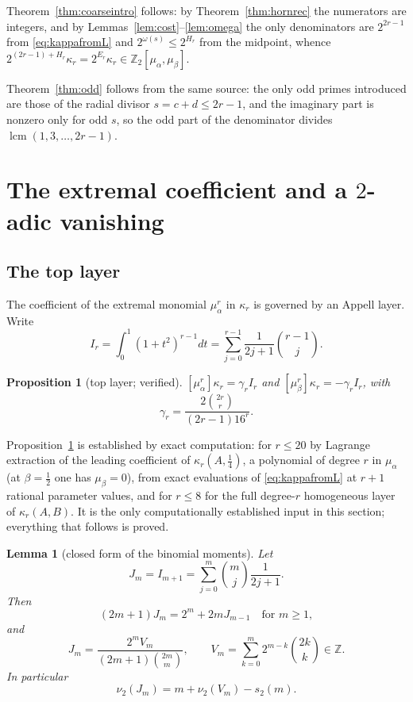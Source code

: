 \documentclass[10pt,a4paper]{amsart}
\newtheorem{lemma}[theorem]{Lemma}
\newtheorem{proposition}[theorem]{Proposition}
\newcommand{\Zt}{\mathbb Z_2}
\newcommand{\ma}{\mu_\alpha}
\newcommand{\mb}{\mu_\beta}
\begin{document}
Theorem~\ref{thm:coarseintro} follows: by Theorem~\ref{thm:hornrec} the numerators are integers, and by Lemmas~\ref{lem:cost}--\ref{lem:omega} the only denominators are $2^{2r-1}$ from \eqref{eq:kappafromL} and $2^{\omega(s)}\le2^{H_r}$ from the midpoint, whence $2^{(2r-1)+H_r}\kappa_r=2^{E_r}\kappa_r\in\Zt[\ma,\mb]$.

Theorem~\ref{thm:odd} follows from the same source: the only odd primes introduced are those of the radial divisor $s=c+d\le2r-1$, and the imaginary part is nonzero only for odd $s$, so the odd part of the denominator divides $\operatorname{lcm}(1,3,\dots,2r-1)$.

\section{The extremal coefficient and a \texorpdfstring{$2$}{2}-adic vanishing}
\label{sec:extremal}

\subsection{The top layer}

The coefficient of the extremal monomial $\ma^r$ in $\kappa_r$ is governed by an Appell layer.  Write
\[
  I_r=\int_0^1(1+t^2)^{r-1}dt=\sum_{j=0}^{r-1}\frac1{2j+1}\binom{r-1}j .
\]

\begin{proposition}[top layer; verified]\label{prop:appell}
$[\ma^r]\kappa_r=\gamma_rI_r$ and $[\mb^r]\kappa_r=-\gamma_rI_r$, with 
\[
\displaystyle\gamma_r=\frac{2\binom{2r}r}{(2r-1)16^r}.
\]
\end{proposition}

Proposition~\ref{prop:appell} is established by exact computation: for $r\le20$ by Lagrange extraction of the leading coefficient of $\kappa_r(A,\tfrac14)$, a polynomial of degree $r$ in $\ma$ (at $\beta=\frac12$ one has $\mb=0$), from exact evaluations of \eqref{eq:kappafromL} at $r+1$ rational parameter values, and for $r\le8$ for the full degree-$r$ homogeneous layer of $\kappa_r(A,B)$.  It is the only computationally established input in this section; everything that follows is proved.

\begin{lemma}[closed form of the binomial moments]\label{lem:endpoint}
Let 
\[
J_m=I_{m+1}=\sum_{j=0}^{m}\binom mj\frac1{2j+1}. 
\]
Then
\[
(2m+1)J_m=2^m+2mJ_{m-1} \quad \text{for } m\ge1, 
\]
and
\[
  J_m=\frac{2^mV_m}{(2m+1)\binom{2m}m},\qquad V_m=\sum_{k=0}^m2^{m-k}\binom{2k}k\in\mathbb Z .
\]
In particular
\[
\nu_2(J_m)=m+\nu_2(V_m)-s_2(m).
\]
\end{lemma}
\end{document}
